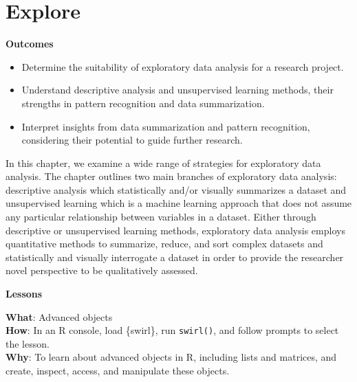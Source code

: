 \documentclass[
  letterpaper,
  krantz1]{latex/krantz-mod}
\providecommand{\tightlist}{%
  \setlength{\itemsep}{0pt}\setlength{\parskip}{0pt}}\usepackage{longtable,booktabs,array}
\newcommand{\setDOI}[1]{%
  \gdef\doi{%
    \footnotesize%
    #1\par%
    This chapter has been made available under a CC-BY-NC-ND license.%
  }%
}
\theoremstyle{definition}
\theoremstyle{definition}
\theoremstyle{remark}
\begin{document}
\chapter{Explore}\label{sec-explore-chapter}

\setDOI{10.4324/9781003393764.8}
\thispagestyle{chapterfirstpage}

\begin{tcolorbox}[enhanced jigsaw, toprule=.15mm, breakable, colback=white, arc=.35mm, left=2mm, colframe=quarto-callout-color-frame, opacityback=0, bottomrule=.15mm, rightrule=.15mm, leftrule=.75mm]

\textbf{ Outcomes}

\begin{itemize}
\tightlist
\item
  Determine the suitability of exploratory data analysis for a research
  project.
\item
  Understand descriptive analysis and unsupervised learning methods,
  their strengths in pattern recognition and data summarization.
\item
  Interpret insights from data summarization and pattern recognition,
  considering their potential to guide further research.
\end{itemize}

\end{tcolorbox}

In this chapter, we examine a wide range of strategies for exploratory
data analysis. The chapter outlines two main branches of exploratory
data analysis: descriptive analysis which statistically and/or visually
summarizes a dataset and unsupervised learning which is a machine
learning approach that does not assume any particular relationship
between variables in a dataset. Either through descriptive or
unsupervised learning methods, exploratory data analysis employs
quantitative methods to summarize, reduce, and sort complex datasets and
statistically and visually interrogate a dataset in order to provide the
researcher novel perspective to be qualitatively assessed.

\begin{tcolorbox}[enhanced jigsaw, toprule=.15mm, breakable, colback=white, arc=.35mm, left=2mm, colframe=quarto-callout-color-frame, opacityback=0, bottomrule=.15mm, rightrule=.15mm, leftrule=.75mm]

\textbf{ Lessons}

\textbf{What}: Advanced objects\\
\textbf{How}: In an R console, load \{swirl\}, run \texttt{swirl()}, and
follow prompts to select the lesson.\\
\textbf{Why}: To learn about advanced objects in R, including lists and
matrices, and create, inspect, access, and manipulate these objects.

\end{tcolorbox}
\end{document}
